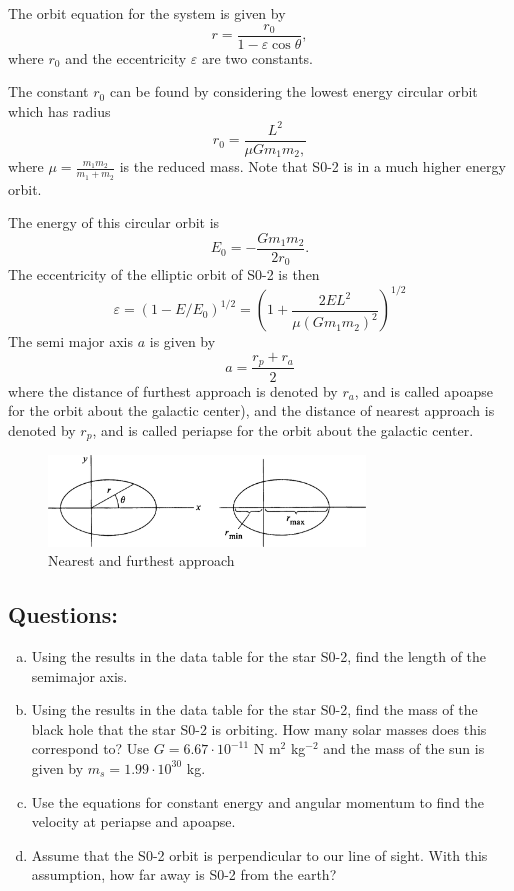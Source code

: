 \documentclass[solutions]{esg8012pset}
\begin{document}
\begin{solution}
    The orbit equation for the system is given by
    $$r = \frac{r_0}{1 - \varepsilon\cos\theta},$$
    where $r_0$ and the eccentricity $\varepsilon$ are two constants.

    The constant $r_0$ can be found by considering the lowest energy circular orbit which has radius
    $$r_0 = \frac{L^2}{\mu G m_1 m_2,}$$
    where $\mu = \frac{m_1 m_2}{m_1 + m_2}$ is the reduced mass. Note that S0-2 is in a much higher energy orbit.

    The energy of this circular orbit is
    $$E_0 = -\frac{G m_1 m_2}{2r_0}.$$
    The eccentricity of the elliptic orbit of S0-2 is then
    $$\varepsilon = (1 - E / E_0)^{1/2} = \left(1 + \frac{2 E L^2}{\mu(G m_1 m_2)^2}\right)^{1/2}$$
    The semi major axis $a$ is given by
    $$a = \frac{r_p + r_a}{2}$$
    where the distance of furthest approach is denoted by $r_a$, and is called apoapse for the orbit about the galactic center), and the distance of nearest approach is denoted by $r_p$, and is called periapse for the orbit about the galactic center.
    \begin{figure}[!h]
      \begin{center}\includegraphics[width=0.75\textwidth]{ps10_6}\end{center}
      \caption{Nearest and furthest approach}
    \end{figure}

  \subsection{Questions:}
    \begin{enumerate}[(a)]
      \item Using the results in the data table for the star S0-2, find the length of the semimajor axis.
      \item Using the results in the data table for the star S0-2, find the mass of the black hole that the star S0-2 is orbiting. How many solar masses does this correspond to?  Use $G = 6.67 \cdot 10^{-11}$ N m$^2$ kg$^{-2}$ and the mass of the sun is given by $m_s = 1.99 \cdot 10^{30}$ kg.
      \item Use the equations for constant energy and angular momentum to find the velocity at periapse and apoapse.
      \item Assume that the S0-2 orbit is perpendicular to our line of sight. With this assumption, how far away is S0-2 from the earth?
    \end{enumerate}

\end{solution}
\end{document}

